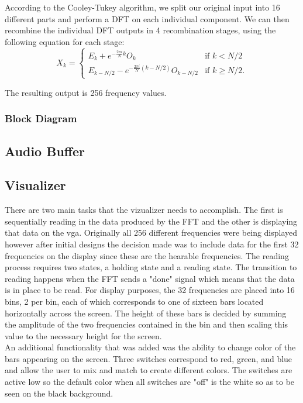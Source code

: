 \documentclass{article}
\begin{document}
	According to the Cooley-Tukey algorithm, 
	we split our original input into 16 different parts and perform a DFT on each
	individual component. We can then recombine the individual DFT outputs in 4
	recombination stages, using the following equation for each stage: 
	$$
	X_k = \left\{
	\begin{matrix}
		E_k + e^{-\frac{2\pi i}{N}k} O_k		& 	\mbox{if } k < N/2 \\ 
		E_{k-N/2} - e^{-\frac{2\pi i}{N} (k-N/2)} O_{k-N/2} & 	\mbox{if }
		k \geq N/2. 
	\end{matrix} 
	\right. 
	$$
	
	The resulting output is 256 frequency values.
	
	\subsubsection{Block Diagram}
	

\subsection{Audio Buffer}

\subsection{Visualizer} There are two main tasks that the vizualizer needs to accomplish.  The first is sequentially reading in the data produced by the FFT and the other is displaying that data on the vga.  Originally all 256 different frequencies were being displayed however after initial designs the decision made was to include data for the first 32 frequencies on the display since these are the hearable frequencies.  The reading process requires two states, a holding state and a reading state.  The transition to reading happens when the FFT sends a "done" signal which means that the data is in place to be read.  For display purposes, the 32 frequencies are placed into 16 bins, 2 per bin, each of which corresponds to one of sixteen bars located horizontally across the screen.  The height of these bars is decided by summing the amplitude of the two frequencies contained in the bin and then scaling this value to the necessary height for the screen.\\An additional functionality that was added was the ability to change color of the bars appearing on the screen.  Three switches correspond to red, green, and blue and allow the user to mix and match to create different colors.  The switches are active low so the default color when all switches are "off" is the white so as to be seen on the black background.
\end{document}
